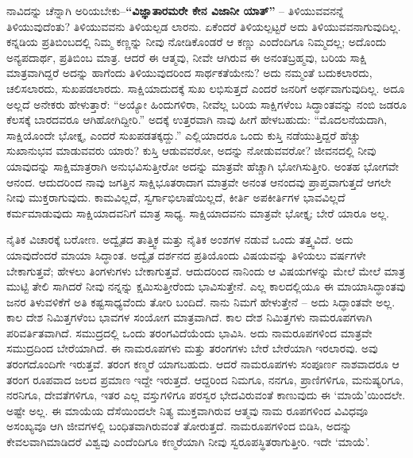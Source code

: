 ನಾವಿದನ್ನು ಚೆನ್ನಾಗಿ ಅರಿಯಬೇಕು–\textbf{“ವಿಜ್ಞಾತಾರಮರೇ ಕೇನ ವಿಜಾನೀ\general{\break } ಯಾತ್​”} – ತಿಳಿಯುವವನನ್ನೆ ತಿಳಿಯುವುದೆಂತು? ತಿಳಿಯುವವನು ತಿಳಿಯಲ್ಪಡ ಲಾರನು. ಏಕೆಂದರೆ ತಿಳಿಯಲ್ಪಟ್ಟರೆ ಅದು ತಿಳಿಯುವವನಾಗುವುದಿಲ್ಲ. ಕನ್ನಡಿಯ ಪ್ರತಿಬಿಂಬದಲ್ಲಿ ನಿಮ್ಮ ಕಣ್ಣನ್ನು ನೀವು ನೋಡಿಕೊಂಡರೆ ಆ ಕಣ್ಣು ಎಂದೆಂದಿಗೂ ನಿಮ್ಮದಲ್ಲ; ಅದೊಂದು ಅನ್ಯಪದಾರ್ಥ, ಪ್ರತಿಬಿಂಬ ಮಾತ್ರ. ಆದರೆ ಈ ಆತ್ಮವು, ನೀವೇ ಆಗಿರುವ ಈ ಅನಂತಬ್ರಹ್ಮವು, ಬರಿಯ ಸಾಕ್ಷಿ ಮಾತ್ರವಾಗಿದ್ದರೆ ಅದನ್ನು ಹಾಗೆಂದು ತಿಳಿಯುವುದರಿಂದ ಸಾರ್ಥಕತೆಯೇನು? ಅದು ನಮ್ಮಂತೆ ಬದುಕಲಾರದು, ಚಲಿಸಲಾರದು, ಸುಖಪಡಲಾರದು. ಸಾಕ್ಷಿಯಾದುದಕ್ಕೆ ಸುಖ ಲಭಿಸುತ್ತದೆ ಎಂದರೆ ಜನರಿಗೆ ಅರ್ಥವಾಗುವುದಿಲ್ಲ. ಅದೂ ಅಲ್ಲದೆ ಅನೇಕರು ಹೇಳುತ್ತಾರೆ: “ಅಯ್ಯೋ ಹಿಂದುಗಳಿರಾ, ನೀವೆಲ್ಲ ಬರಿಯ ಸಾಕ್ಷಿಗಳೆಂಬ ಸಿದ್ಧಾಂತವನ್ನು ನಂಬಿ ಜಡರೂ ಕೆಲಸಕ್ಕೆ ಬಾರದವರೂ ಆಗಿಹೋಗಿದ್ದೀರಿ.” ಅದಕ್ಕೆ ಉತ್ತರವಾಗಿ ನಾವು ಹೀಗೆ ಹೇಳಬಹುದು: “ಮೊದಲನೆಯದಾಗಿ, ಸಾಕ್ಷಿಯೊಂದೇ ಭೋಕ್ತೃ, ಎಂದರೆ ಸುಖಪಡತಕ್ಕದ್ದು.” ಎಲ್ಲಿಯಾದರೂ ಒಂದು ಕುಸ್ತಿ ನಡೆಯುತ್ತಿದ್ದರೆ ಹೆಚ್ಚು ಸುಖಾನುಭವ ಮಾಡುವವರು ಯಾರು? ಕುಸ್ತಿ ಆಡುವವರೋ, ಅದನ್ನು ನೋಡುವವರೋ? ಜೀವನದಲ್ಲಿ ನೀವು ಯಾವುದನ್ನು ಸಾಕ್ಷಿಮಾತ್ರರಾಗಿ ಅನುಭವಿಸುತ್ತೀರೋ ಅದನ್ನು ಮಾತ್ರವೇ ಹೆಚ್ಚಾಗಿ ಭೋಗಿಸುತ್ತೀರಿ. ಅಂತಹ ಭೋಗವೇ ಆನಂದ. ಆದುದರಿಂದ ನಾವು ಜಗತ್ತಿನ ಸಾಕ್ಷಿಭೂತರಾದಾಗ ಮಾತ್ರವೇ ಅನಂತ ಆನಂದವು ಪ್ರಾಪ್ತವಾಗುತ್ತದೆ ಆಗಲೇ ನೀವು ಮುಕ್ತರಾಗುವುದು. ಕಾಮವಿಲ್ಲದೆ, ಸ್ವರ್ಗಾಭಿಲಾಷೆಯಿಲ್ಲದೆ, ಕೀರ್ತಿ ಅಪಕೀರ್ತಿಗಳ ಭಾವವಿಲ್ಲದೆ ಕರ್ಮಮಾಡುವುದು ಸಾಕ್ಷಿಯಾದವನಿಗೆ ಮಾತ್ರ ಸಾಧ್ಯ. ಸಾಕ್ಷಿಯಾದವನು ಮಾತ್ರವೇ ಭೋಕ್ತೃ; ಬೇರೆ ಯಾರೂ ಅಲ್ಲ. 

ನೈತಿಕ ವಿಚಾರಕ್ಕೆ ಬರೋಣ. ಅದ್ವೈತದ ತಾತ್ತ್ವಿಕ ಮತ್ತು ನೈತಿಕ ಅಂಶಗಳ ನಡುವೆ ಒಂದು ತತ್ತ್ವವಿದೆ. ಅದು ಯಾವುದೆಂದರೆ ಮಾಯಾ ಸಿದ್ಧಾಂತ. ಅದ್ವೈತ ದರ್ಶನದ ಪ್ರತಿಯೊಂದು ವಿಷಯವನ್ನು ತಿಳಿಯಲು ವರ್ಷಗಳೇ ಬೇಕಾಗುತ್ತವೆ; ಹೇಳಲು ತಿಂಗಳುಗಳು ಬೇಕಾಗುತ್ತವೆ. ಆದುದರಿಂದ ನಾನಿಂದು ಆ ವಿಷಯಗಳನ್ನು ಮೇಲೆ ಮೇಲೆ ಮಾತ್ರ ಮುಟ್ಟಿ ತೇಲಿ ಸಾಗಿದರೆ ನೀವು ನನ್ನನ್ನು ಕ್ಷಮಿಸುತ್ತೀರೆಂದು ಭಾವಿಸುತ್ತೇನೆ. ಎಲ್ಲ ಕಾಲದಲ್ಲಿಯೂ ಈ ಮಾಯಾಸಿದ್ಧಾಂತವು ಜನರ ತಿಳುವಳಿಕೆಗೆ ಅತಿ ಕಷ್ಟಸಾಧ್ಯವೆಂದು ತೋರಿ ಬಂದಿದೆ. ನಾನು ನಿಮಗೆ ಹೇಳುತ್ತೇನೆ – ಅದು ಸಿದ್ಧಾಂತವೇ ಅಲ್ಲ. ಕಾಲ ದೇಶ ನಿಮಿತ್ತಗಳೆಂಬ ಭಾವಗಳ ಸಂಯೋಗ ಮಾತ್ರವಾಗಿದೆ. ಕಾಲ ದೇಶ ನಿಮಿತ್ತಗಳು ನಾಮರೂಪಗಳಾಗಿ ಪರಿವರ್ತಿತವಾಗಿದೆ. ಸಮುದ್ರದಲ್ಲಿ ಒಂದು ತರಂಗವಿದೆಯೆಂದು ಭಾವಿಸಿ. ಅದು ನಾಮರೂಪಗಳಿಂದ ಮಾತ್ರವೇ ಸಮುದ್ರದಿಂದ ಬೇರೆಯಾಗಿದೆ. ಈ ನಾಮರೂಪಗಳು ಮತ್ತು ತರಂಗಗಳು ಬೇರೆ ಬೇರೆಯಾಗಿ ಇರಲಾರವು. ಅವು ತರಂಗದೊಂದಿಗೇ ಇರುತ್ತವೆ. ತರಂಗ ಕಣ್ಮರೆ ಯಾಗಬಹುದು. ಆದರೆ ನಾಮರೂಪಗಳು ಸಂಪೂರ್ಣ ನಾಶವಾದರೂ ಆ ತರಂಗ ರೂಪವಾದ ಜಲದ ಪ್ರಮಾಣ ಇದ್ದೇ ಇರುತ್ತದೆ. ಆದ್ದರಿಂದ ನಿಮಗೂ, ನನಗೂ, ಪ್ರಾಣಿಗಳಿಗೂ, ಮನುಷ್ಯರಿಗೂ, ನರನಿಗೂ, ದೇವತೆಗಳಿಗೂ, ಇತರ ಎಲ್ಲ ವಸ್ತುಗಳಿಗೂ ಪರಸ್ವರ ಭೇದವಿರುವಂತೆ ಕಾಣುವುದು ಈ ‘ಮಾಯೆ’ಯಿಂದಲೇ. ಅಷ್ಟೇ ಅಲ್ಲ. ಈ ಮಾಯೆಯ ದೆಸೆಯಿಂದಲೇ ನಿತ್ಯ ಮುಕ್ತವಾಗಿರುವ ಆತ್ಮವು ನಾಮ ರೂಪಗಳಿಂದ ವಿವಿಧವೂ ಅಸಂಖ್ಯವೂ ಆಗಿ ಜೀವಗಳಲ್ಲಿ ಬಂಧಿತವಾಗಿರುವಂತೆ ತೋರುತ್ತದೆ. ನಾಮರೂಪಗಳಿಂದ ಬಿಡಿಸಿ, ಅದನ್ನು ಕೇವಲವಾಗಿ\break ಮಾಡಿದರೆ ವಿಶ್ವವು ಎಂದೆಂದಿಗೂ ಕಣ್ಮರೆಯಾಗಿ ನೀವು ಸ್ವರೂಪಸ್ಥಿತರಾಗುತ್ತೀರಿ. ಇದೇ ‘ಮಾಯೆ’. 

